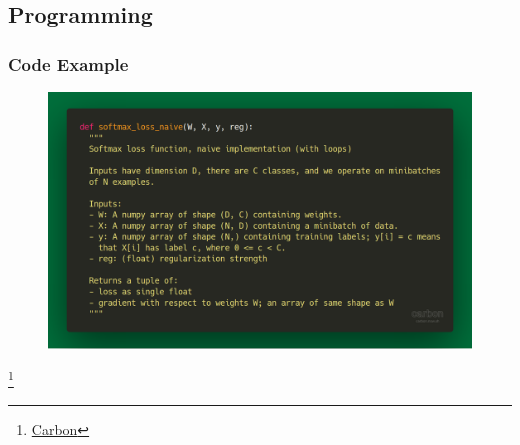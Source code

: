 \documentclass{IFES-beamer}
\begin{document}
\subsection{Programming}
\begin{frame}[fragile]

\frametitle{Code Example}

\begin{figure}
\centering
\includegraphics[width=\linewidth]{images/carbon.png}
\end{figure}
\footnote{\href{https://github.com/dawnlabs/carbon}{Carbon}}



\end{frame}
\end{document}
